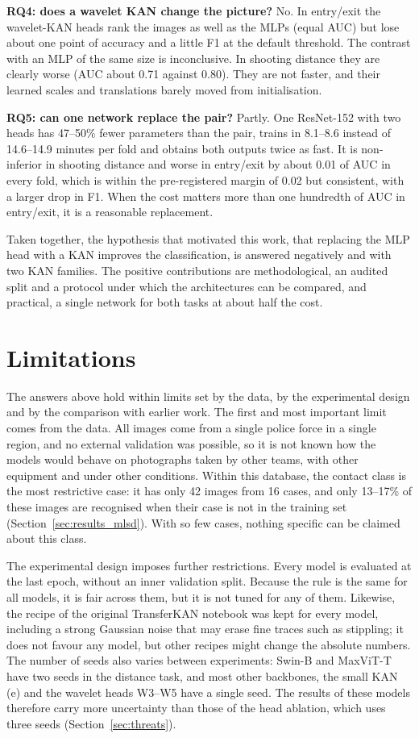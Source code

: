 \textbf{RQ4: does a wavelet KAN change the picture?} No. In entry/exit the wavelet-KAN heads rank the images as well as the MLPs (equal AUC) but lose about one point of accuracy and a little F1 at the default threshold. The contrast with an MLP of the same size is inconclusive. In shooting distance they are clearly worse (AUC about 0.71 against 0.80). They are not faster, and their learned scales and translations barely moved from initialisation.

\textbf{RQ5: can one network replace the pair?} Partly. One ResNet-152 with two heads has 47--50\% fewer parameters than the pair, trains in 8.1--8.6 instead of 14.6--14.9 minutes per fold and obtains both outputs twice as fast. It is non-inferior in shooting distance and worse in entry/exit by about 0.01 of AUC in every fold, which is within the pre-registered margin of 0.02 but consistent, with a larger drop in F1. When the cost matters more than one hundredth of AUC in entry/exit, it is a reasonable replacement.

Taken together, the hypothesis that motivated this work, that replacing the MLP head with a KAN improves the classification, is answered negatively and with two KAN families. The positive contributions are methodological, an audited split and a protocol under which the architectures can be compared, and practical, a single network for both tasks at about half the cost.

\section{Limitations}
\label{sec:limitations}

The answers above hold within limits set by the data, by the experimental design and by the comparison with earlier work. The first and most important limit comes from the data. All images come from a single police force in a single region, and no external validation was possible, so it is not known how the models would behave on photographs taken by other teams, with other equipment and under other conditions. Within this database, the contact class is the most restrictive case: it has only 42 images from 16 cases, and only 13--17\% of these images are recognised when their case is not in the training set (Section~\ref{sec:results_mlsd}). With so few cases, nothing specific can be claimed about this class.

The experimental design imposes further restrictions. Every model is evaluated at the last epoch, without an inner validation split. Because the rule is the same for all models, it is fair across them, but it is not tuned for any of them. Likewise, the recipe of the original TransferKAN notebook was kept for every model, including a strong Gaussian noise that may erase fine traces such as stippling; it does not favour any model, but other recipes might change the absolute numbers. The number of seeds also varies between experiments: Swin-B and MaxViT-T have two seeds in the distance task, and most other backbones, the small KAN (e) and the wavelet heads W3--W5 have a single seed. The results of these models therefore carry more uncertainty than those of the head ablation, which uses three seeds (Section~\ref{sec:threats}).

